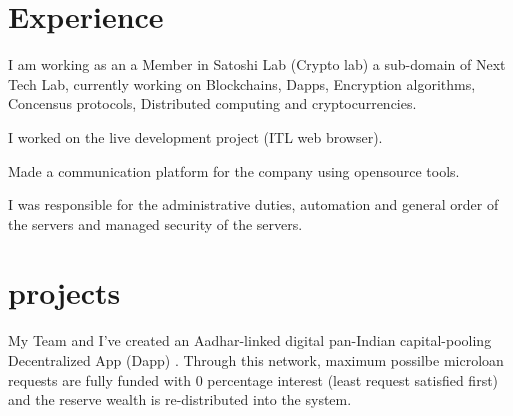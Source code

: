 \documentclass[]{deedy-resume-openfont}
\begin{document}
\begin{minipage}[t]{0.66\textwidth}


\section{Experience}

\vspace{\topsep} %
\begin{tightemize}
\item I am working as an a Member in Satoshi Lab (Crypto lab) a sub-domain of Next Tech Lab, currently working on Blockchains, Dapps, Encryption algorithms, Concensus protocols, Distributed computing and cryptocurrencies.
\end{tightemize}
\sectionsep

\vspace{\topsep} %
\begin{tightemize}
\item I worked on the live development project (ITL web browser).
\item Made a communication platform for the company using opensource tools.
\end{tightemize}
\sectionsep

\begin{tightemize}
\item I was responsible for the administrative duties, automation and general order of the servers and managed security of the servers.

\end{tightemize}
\sectionsep



\section{projects}
My Team and I've created an Aadhar-linked digital pan-Indian capital-pooling Decentralized App (Dapp) . Through this network, maximum possilbe microloan requests are fully funded with 0 percentage interest (least request satisfied first) and the reserve wealth is re-distributed into the system.
\sectionsep


\end{minipage}
\end{document}

